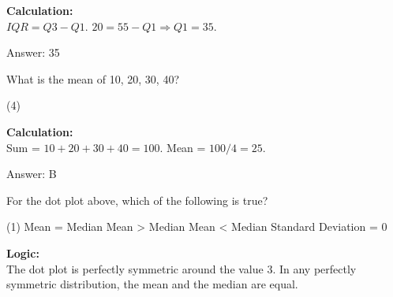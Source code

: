 \documentclass[11pt,paper=a4,answers]{exam}
\begin{document}
\begin{questions}
\begin{solution}
\textbf{Calculation:} \\
$IQR = Q3 - Q1$. 
$20 = 55 - Q1 \Rightarrow Q1 = 35$.

\vspace{30pt}

Answer: \colorbox{yellow!100}{35}
\end{solution}

\vspace{60pt}

\question
What is the mean of {10, 20, 30, 40}?
\begin{tasks}(4)
\end{tasks}

\begin{solution}
\textbf{Calculation:} \\
Sum = $10 + 20 + 30 + 40 = 100$. 
Mean = $100 / 4 = 25$.

\vspace{30pt}

Answer: \colorbox{yellow!100}{B}
\end{solution}

\vspace{60pt}

\question
\begin{center}
\end{center}
For the dot plot above, which of the following is true?
\begin{tasks}(1)
    \task Mean = Median
    \task Mean > Median
    \task Mean < Median
    \task Standard Deviation = 0
\end{tasks}

\begin{solution}
\textbf{Logic:} \\
The dot plot is perfectly symmetric around the value 3. In any perfectly symmetric distribution, the mean and the median are equal.

\vspace{30pt}


\end{solution}
\end{questions}
\end{document}
